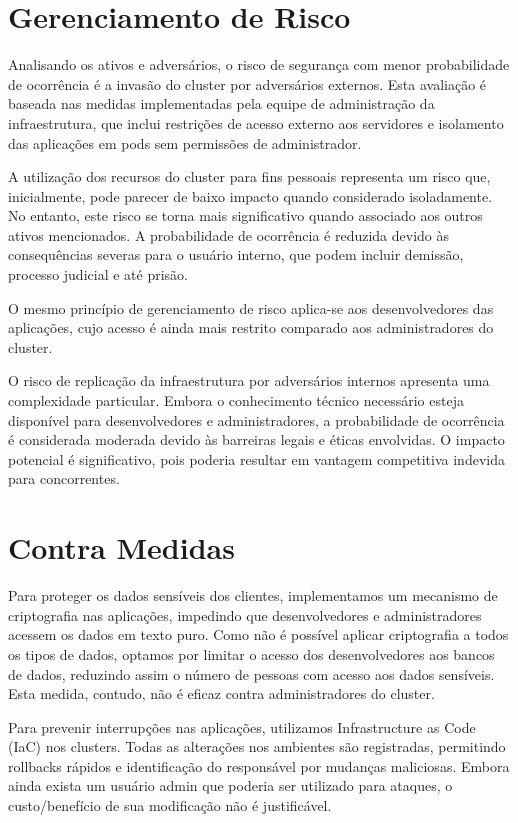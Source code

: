 \documentclass[12pt]{article}
\begin{document}
\section{Gerenciamento de Risco}

Analisando os ativos e adversários, o risco de segurança com menor probabilidade de ocorrência é a invasão do cluster por adversários externos. Esta avaliação é baseada nas medidas implementadas pela equipe de administração da infraestrutura, que inclui restrições de acesso externo aos servidores e isolamento das aplicações em pods sem permissões de administrador.

A utilização dos recursos do cluster para fins pessoais representa um risco que, inicialmente, pode parecer de baixo impacto quando considerado isoladamente. No entanto, este risco se torna mais significativo quando associado aos outros ativos mencionados. A probabilidade de ocorrência é reduzida devido às consequências severas para o usuário interno, que podem incluir demissão, processo judicial e até prisão.

O mesmo princípio de gerenciamento de risco aplica-se aos desenvolvedores das aplicações, cujo acesso é ainda mais restrito comparado aos administradores do cluster.

O risco de replicação da infraestrutura por adversários internos apresenta uma complexidade particular. Embora o conhecimento técnico necessário esteja disponível para desenvolvedores e administradores, a probabilidade de ocorrência é considerada moderada devido às barreiras legais e éticas envolvidas. O impacto potencial é significativo, pois poderia resultar em vantagem competitiva indevida para concorrentes.

\section{Contra Medidas}

Para proteger os dados sensíveis dos clientes, implementamos um mecanismo de criptografia nas aplicações, impedindo que desenvolvedores e administradores acessem os dados em texto puro. Como não é possível aplicar criptografia a todos os tipos de dados, optamos por limitar o acesso dos desenvolvedores aos bancos de dados, reduzindo assim o número de pessoas com acesso aos dados sensíveis. Esta medida, contudo, não é eficaz contra administradores do cluster.

Para prevenir interrupções nas aplicações, utilizamos Infrastructure as Code (IaC) nos clusters. Todas as alterações nos ambientes são registradas, permitindo rollbacks rápidos e identificação do responsável por mudanças maliciosas. Embora ainda exista um usuário admin que poderia ser utilizado para ataques, o custo/benefício de sua modificação não é justificável.
\end{document}
